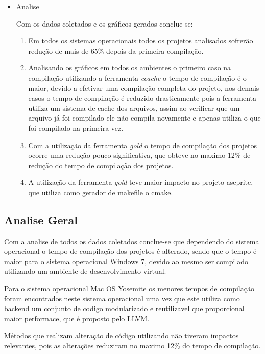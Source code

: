 \begin{itemize}
    \item Analise

    Com os dados coletados e os gráficos gerados conclue-se:

    \begin{enumerate}
        \item Em todos os sistemas operacionais todos os projetos
 analisados sofrerão redução de mais de 65\%  depois da primeira compilação.
        \item Analisando os gráficos em todos os ambientes o primeiro
 caso na compilação utilizando a ferramenta \textit{ccache} o tempo de compilação é o maior,
 devido a efetivar uma compilação completa do projeto, nos demais casos o tempo de compilação
 é reduzido drasticamente pois a ferramenta utiliza um sistema de cache dos arquivos, assim ao
 verificar que um arquivo já foi compilado ele não compila novamente e apenas utiliza o que foi
 compilado na primeira vez.
        \item Com a utilização da ferramenta \textit{gold} o tempo de compilação
 dos projetos ocorre uma redução pouco significativa, que obteve no maximo 12\% de
 redução do tempo de compilação dos projetos. 
        \item A utilização da ferramenta \textit{gold} teve maior impacto no projeto aseprite, que utiliza
 como gerador de makefile o cmake.
    \end{enumerate}
\end{itemize}

\clearpage
\subsection{Analise Geral}
    Com a analise de todos os dados coletados conclue-se que dependendo do sistema operacional o
 tempo de compilação dos projetos é alterado, sendo que o tempo é maior para o sistema operacional Windows 7,
 devido ao mesmo ser compilado utilizando um ambiente de desenvolvimento virtual.

    Para o sistema operacional Mac OS Yosemite os menores tempos de compilação foram encontrados neste
 sistema operacional uma vez que este utiliza como backend um conjunto de codigo modularizado e reutilizavel
 que proporcional maior performace, que é proposto pelo LLVM.

    Métodos que realizam alteração de código utilizando  não tiveram impactos relevantes, pois as alterações
 reduziram no maximo 12\% do tempo de compilação.

